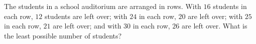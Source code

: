 The students in a school auditorium are arranged in rows. With $16$ students in each row, $12$ students are left over; with $24$ in each row, $20$ are left over; with $25$ in each row, $21$ are left over; and with $30$ in each row, $26$ are left over. What is the least possible number of students?
